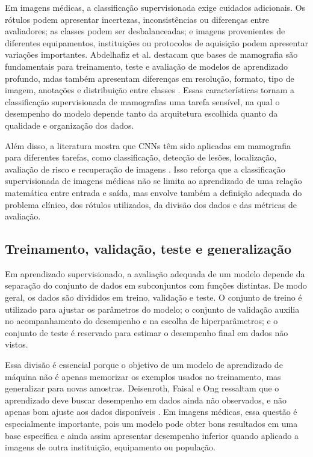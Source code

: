 \documentclass[
    12pt,
    openright,
    oneside,
    a4paper,
    english,
    brazil
]{abntex2}
\begin{document}
Em imagens médicas, a classificação supervisionada exige cuidados adicionais. Os rótulos podem apresentar incertezas, inconsistências ou diferenças entre avaliadores; as classes podem ser desbalanceadas; e imagens provenientes de diferentes equipamentos, instituições ou protocolos de aquisição podem apresentar variações importantes. Abdelhafiz et al. destacam que bases de mamografia são fundamentais para treinamento, teste e avaliação de modelos de aprendizado profundo, mdas também apresentam diferenças em resolução, formato, tipo de imagem, anotações e distribuição entre classes \cite{abdelhafiz2019}. Essas características tornam a classificação supervisionada de mamografias uma tarefa sensível, na qual o desempenho do modelo depende tanto da arquitetura escolhida quanto da qualidade e organização dos dados.

Além disso, a literatura mostra que CNNs têm sido aplicadas em mamografia para diferentes tarefas, como classificação, detecção de lesões, localização, avaliação de risco e recuperação de imagens \cite{abdelhafiz2019}. Isso reforça que a classificação supervisionada de imagens médicas não se limita ao aprendizado de uma relação matemática entre entrada e saída, mas envolve também a definição adequada do problema clínico, dos rótulos utilizados, da divisão dos dados e das métricas de avaliação.

\subsection{Treinamento, validação, teste e generalização}
\label{subsec:treinamento_validacao_teste_generalizacao}

Em aprendizado supervisionado, a avaliação adequada de um modelo depende da separação do conjunto de dados em subconjuntos com funções distintas. De modo geral, os dados são divididos em treino, validação e teste. O conjunto de treino é utilizado para ajustar os parâmetros do modelo; o conjunto de validação auxilia no acompanhamento do desempenho e na escolha de hiperparâmetros; e o conjunto de teste é reservado para estimar o desempenho final em dados não vistos.

Essa divisão é essencial porque o objetivo de um modelo de aprendizado de máquina não é apenas memorizar os exemplos usados no treinamento, mas generalizar para novas amostras. Deisenroth, Faisal e Ong ressaltam que o aprendizado deve buscar desempenho em dados ainda não observados, e não apenas bom ajuste aos dados disponíveis \cite{deisenroth2020mathematics}. Em imagens médicas, essa questão é especialmente importante, pois um modelo pode obter bons resultados em uma base específica e ainda assim apresentar desempenho inferior quando aplicado a imagens de outra instituição, equipamento ou população.
\end{document}
